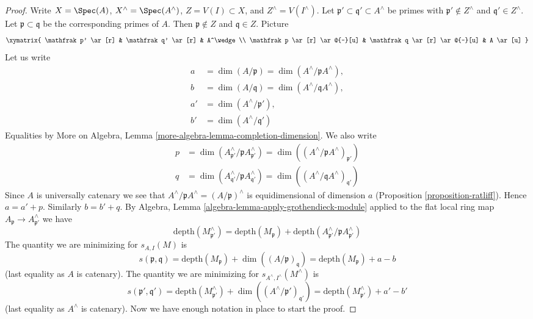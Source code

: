 \begin{proof}
Write $X = \Spec(A)$, $X^\wedge = \Spec(A^\wedge)$, $Z = V(I) \subset X$, and
$Z^\wedge = V(I^\wedge)$.
Let $\mathfrak p' \subset \mathfrak q' \subset A^\wedge$
be primes with $\mathfrak p' \not \in Z^\wedge$ and
$\mathfrak q' \in Z^\wedge$. Let $\mathfrak p \subset \mathfrak q$
be the corresponding primes of $A$. Then $\mathfrak p \not \in Z$
and $\mathfrak q \in Z$. Picture
$$
\xymatrix{
\mathfrak p' \ar[r] & \mathfrak q' \ar[r] & A^\wedge \\
\mathfrak p \ar[r] \ar@{-}[u] &
\mathfrak q \ar[r] \ar@{-}[u] & A \ar[u]
}
$$
Let us write
\begin{align*}
a & = \dim(A/\mathfrak p) = \dim(A^\wedge/\mathfrak pA^\wedge),\\
b & = \dim(A/\mathfrak q) = \dim(A^\wedge/\mathfrak qA^\wedge),\\
a' & = \dim(A^\wedge/\mathfrak p'),\\
b' & = \dim(A^\wedge/\mathfrak q')
\end{align*}
Equalities by
More on Algebra, Lemma \ref{more-algebra-lemma-completion-dimension}.
We also write
\begin{align*}
p & = \dim(A^\wedge_{\mathfrak p'}/\mathfrak p A^\wedge_{\mathfrak p'}) =
\dim((A^\wedge/\mathfrak p A^\wedge)_{\mathfrak p'}) \\
q & = \dim(A^\wedge_{\mathfrak q'}/\mathfrak p A^\wedge_{\mathfrak q'}) =
\dim((A^\wedge/\mathfrak q A^\wedge)_{\mathfrak q'})
\end{align*}
Since $A$ is universally catenary we see that
$A^\wedge/\mathfrak pA^\wedge = (A/\mathfrak p)^\wedge$
is equidimensional of dimension $a$ (Proposition \ref{proposition-ratliff}).
Hence $a = a' + p$. Similarly $b = b' + q$.
By Algebra, Lemma \ref{algebra-lemma-apply-grothendieck-module}
applied to the flat local ring map
$A_\mathfrak p \to A^\wedge_{\mathfrak p'}$
we have
$$
\text{depth}(M^\wedge_{\mathfrak p'})
=
\text{depth}(M_\mathfrak p) +
\text{depth}(A^\wedge_{\mathfrak p'} / \mathfrak p A^\wedge_{\mathfrak p'})
$$
The quantity we are minimizing for $s_{A, I}(M)$ is
$$
s(\mathfrak p, \mathfrak q) =
\text{depth}(M_\mathfrak p) + \dim((A/\mathfrak p)_\mathfrak q) =
\text{depth}(M_\mathfrak p) + a - b
$$
(last equality as $A$ is catenary). The quantity we are minimizing
for $s_{A^\wedge, I^\wedge}(M^\wedge)$
is
$$
s(\mathfrak p', \mathfrak q') =
\text{depth}(M^\wedge_{\mathfrak p'}) +
\dim((A^\wedge/\mathfrak p')_{\mathfrak q'}) =
\text{depth}(M^\wedge_{\mathfrak p'}) + a' - b'
$$
(last equality as $A^\wedge$ is catenary).
Now we have enough notation in place to start the proof.


\end{proof}

